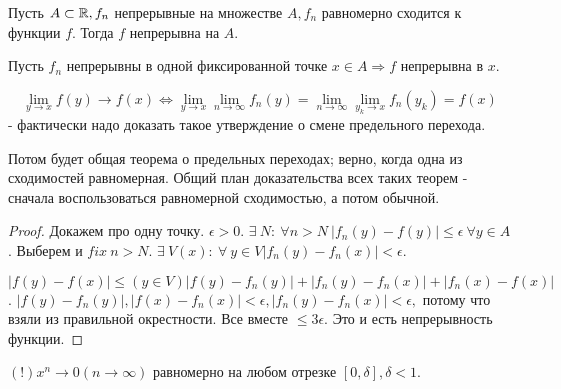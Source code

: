 \documentclass[12pt]{report}
\begin{document}
\begin{thm}
Пусть $A \subset \mathbb{R}, f_n$ непрерывные на множестве $A, f_n$ равномерно сходится к функции $f$. Тогда $f$ непрерывна на $A$.

Пусть $f_n$ непрерывны в одной фиксированной точке $x \in A \Rightarrow f$ непрерывна в $x$.

$$\lim_{y \to x}{f(y)} \to f(x) \Leftrightarrow \lim_{y \to x}{\lim_{n \to \infty}{f_n(y)}} = \lim_{n \to \infty}{\lim_{y_k \to x}{f_n(y_k)}} = f(x)$$ - фактически надо доказать такое утверждение о смене предельного перехода. 

Потом будет общая теорема о предельных переходах; верно, когда одна из сходимостей равномерная. Общий план доказательства всех таких теорем - сначала воспользоваться равномерной сходимостью, а потом обычной.
\end{thm}
\begin{proof}
Докажем про одну точку. $\epsilon > 0$. $\exists ~N: ~\forall n > N ~|f_n(y) - f(y)| \le \epsilon ~\forall y \in A$. Выберем и $fix ~n > N$. $\exists ~V(x): ~\forall ~y \in V |f_n(y) - f_n(x)| < \epsilon$.

$|f(y) - f(x)| \le (y \in V) |f(y) - f_n(y)| + |f_n(y) - f_n(x)| + |f_n(x) - f(x)|$. $|f(y) - f_n(y)|, |f(x) - f_n(x)| < \epsilon, |f_n(y) - f_n(x)| < \epsilon,$ потому что взяли из правильной окрестности. Все вместе $\le 3\epsilon$. Это и есть непрерывность функции.
\end{proof}

\begin{probl}
$(!) x^n \to 0 (n \to \infty)$ равномерно на любом отрезке $[0, \delta], \delta < 1$.
\end{probl}
\end{document}
